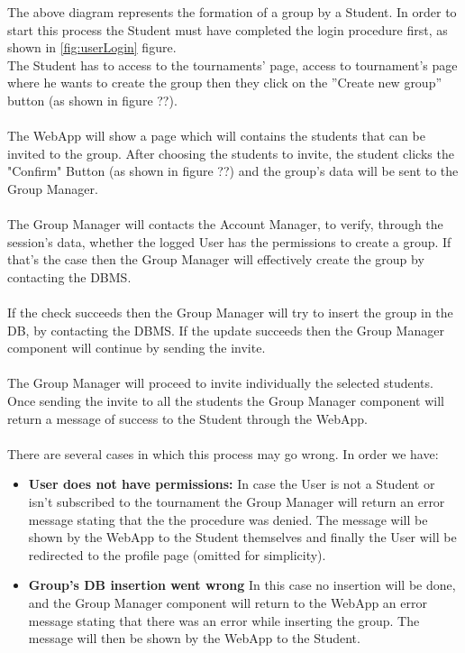 \documentclass{article}
\begin{document}
{        \newpage
        The above diagram represents the formation of a group by a Student.
        In order to start this process the Student must have completed the login 
        procedure first, as shown in \ref{fig:userLogin} figure.\\  
        The Student has to access to the tournaments' page, access 
        to tournament's page where he wants to create the group then 
        they click on the ”Create new group” button (as shown in figure ??).
        \\ \\
        The WebApp will show a page which will contains the students that can be
        invited to the group. After choosing the students to invite, the student 
        clicks the "Confirm" Button (as shown in figure ??) and the group's data 
        will be sent to the Group Manager.
        \\ \\
        The Group Manager will contacts the Account Manager, to verify, through
        the session’s data, whether the logged User has the permissions to create
        a group. If that’s the case then the Group Manager will effectively create
        the group by contacting the DBMS.
        \\ \\
        If the check succeeds then the Group Manager will try to insert the group
        in the DB, by contacting the DBMS.
        If the update succeeds then the Group Manager component will continue by
        sending the invite.
        \\ \\
        The Group Manager will proceed to invite individually the selected students.
        Once sending the invite to all the students the Group Manager component will 
        return a message of success to the Student through the WebApp.
        \\ \\
        There are several cases in which this process may go wrong. In order we have:
        \begin{itemize}
            \item \textbf{User does not have permissions:} In case the User is not a Student
            or isn't subscribed to the tournament the Group Manager will return an error message 
            stating that the the procedure was denied. The message will be shown 
            by the WebApp to the Student themselves and finally the User will be
            redirected to the profile page (omitted for simplicity).
            \item \textbf{Group's DB insertion went wrong} In this case no insertion will
            be done, and the Group Manager component will return to the WebApp 
            an error message stating that there was an error while inserting the group. 
            The message will then be shown by the WebApp to the Student.
        \end{itemize}


}
\end{document}
